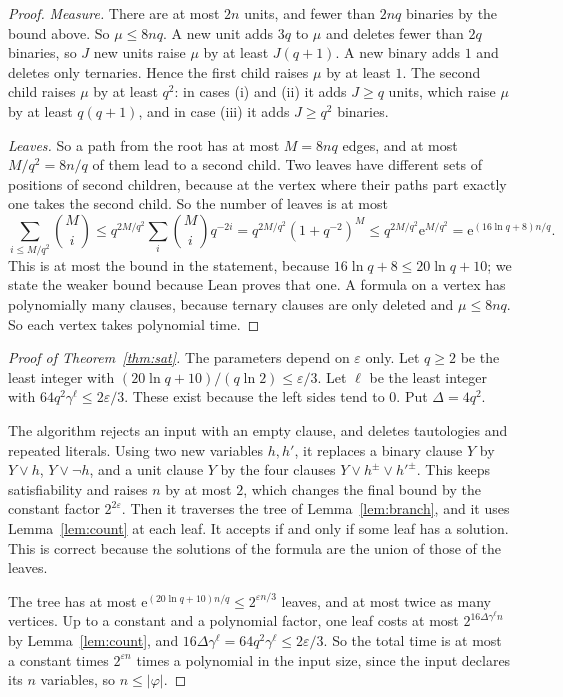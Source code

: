 \documentclass[11pt]{article}
\begin{document}
\begin{proof}
\emph{Measure.} There are at most $2n$ units, and fewer than $2nq$ binaries by the bound above. So $\mu\le8nq$. A new unit adds $3q$ to $\mu$ and deletes fewer than $2q$ binaries, so $J$ new units raise $\mu$ by at least $J(q+1)$. A new binary adds $1$ and deletes only ternaries. Hence the first child raises $\mu$ by at least $1$. The second child raises $\mu$ by at least $q^2$: in cases (i) and (ii) it adds $J\ge q$ units, which raise $\mu$ by at least $q(q+1)$, and in case (iii) it adds $J\ge q^2$ binaries.

\emph{Leaves.} So a path from the root has at most $M=8nq$ edges, and at most $M/q^2=8n/q$ of them lead to a second child. Two leaves have different sets of positions of second children, because at the vertex where their paths part exactly one takes the second child. So the number of leaves is at most
\[
\sum_{i\le M/q^2}\binom Mi\le q^{2M/q^2}\sum_i\binom Miq^{-2i}=q^{2M/q^2}(1+q^{-2})^M\le q^{2M/q^2}\mathrm e^{M/q^2}=\mathrm e^{(16\ln q+8)n/q}.
\]
This is at most the bound in the statement, because $16\ln q+8\le20\ln q+10$; we state the weaker bound because Lean proves that one. A formula on a vertex has polynomially many clauses, because ternary clauses are only deleted and $\mu\le8nq$. So each vertex takes polynomial time.
\end{proof}

\begin{proof}[Proof of Theorem~\ref{thm:sat}]
The parameters depend on $\varepsilon$ only. Let $q\ge2$ be the least integer with $(20\ln q+10)/(q\ln2)\le\varepsilon/3$. Let $\ell$ be the least integer with $64q^2\gamma^\ell\le2\varepsilon/3$. These exist because the left sides tend to $0$. Put $\Delta=4q^2$.

The algorithm rejects an input with an empty clause, and deletes tautologies and repeated literals. Using two new variables $h,h'$, it replaces a binary clause $Y$ by $Y\vee h$, $Y\vee\neg h$, and a unit clause $Y$ by the four clauses $Y\vee h^{\pm}\vee h'^{\pm}$. This keeps satisfiability and raises $n$ by at most $2$, which changes the final bound by the constant factor $2^{2\varepsilon}$. Then it traverses the tree of Lemma~\ref{lem:branch}, and it uses Lemma~\ref{lem:count} at each leaf. It accepts if and only if some leaf has a solution. This is correct because the solutions of the formula are the union of those of the leaves.

The tree has at most $\mathrm e^{(20\ln q+10)n/q}\le2^{\varepsilon n/3}$ leaves, and at most twice as many vertices. Up to a constant and a polynomial factor, one leaf costs at most $2^{16\Delta\gamma^\ell n}$ by Lemma~\ref{lem:count}, and $16\Delta\gamma^\ell=64q^2\gamma^\ell\le2\varepsilon/3$. So the total time is at most a constant times $2^{\varepsilon n}$ times a polynomial in the input size, since the input declares its $n$ variables, so $n\le|\varphi|$.
\end{proof}
\end{document}
